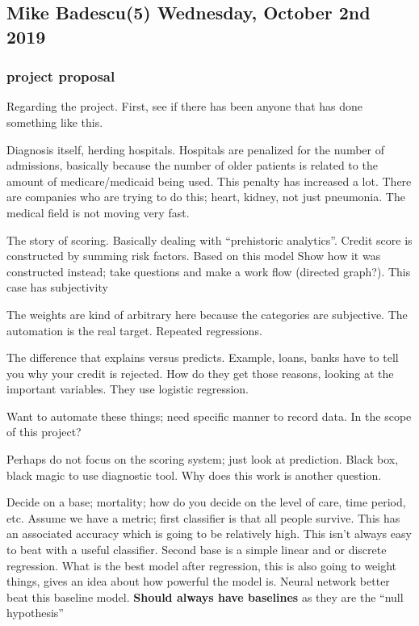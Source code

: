 \subsection{Mike Badescu(5) Wednesday, October 2nd 2019}

\subsubsection{project proposal}

Regarding the project. First, see if there has
been anyone that has done something like this.

Diagnosis itself, herding hospitals. Hospitals
are penalized for the number of admissions, basically
because the number of older patients is related to the
amount of medicare/medicaid being used. This penalty
has increased a lot. There are companies who are
trying to do this; heart, kidney, not just pneumonia. The medical field is not moving
very fast.

The story of scoring. Basically dealing
with ``prehistoric analytics''. Credit score is
constructed by summing risk factors. Based on this model 
Show how it was constructed instead; take questions and make a work flow (directed graph?). This case has subjectivity

The weights are kind of arbitrary here because the categories are subjective. The automation is the real target. Repeated regressions.

The difference that explains versus predicts. Example, loans, banks have to tell you why your
credit is rejected. How do they get those
reasons, looking at the important variables.
They use logistic regression. 

Want to automate these things; need specific
manner to record data. In the scope of this
project? 

Perhaps do not focus on the scoring system;
just look at prediction. Black box, black magic
to use diagnostic tool. Why does this work is
another question. 

Decide on a base; mortality; how do you decide
on the level of care, time period, etc. Assume
we have a metric; first classifier is that all
people survive. This has an associated accuracy
which is going to be relatively high. This
isn't always easy to beat with a useful classifier. Second base is a simple linear and
or discrete regression. What is the best model after regression, this is also going to weight things, gives an idea about how powerful the model is. Neural network better beat this baseline model. \textbf{Should always have baselines} as they are the ``null hypothesis''


